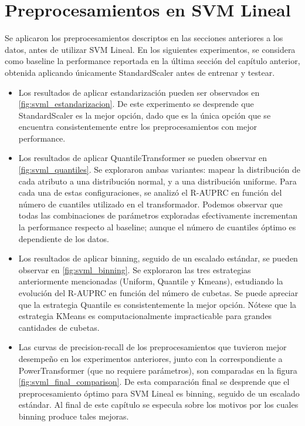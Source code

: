 \section { Preprocesamientos en SVM Lineal }

Se aplicaron los preprocesamientos descriptos en las secciones anteriores a los datos, antes de utilizar SVM Lineal. En los siguientes experimentos, se considera como baseline la performance reportada en la última sección del capítulo anterior, obtenida aplicando únicamente StandardScaler antes de entrenar y testear. 

\begin{itemize}

\item Los resultados de aplicar estandarización pueden ser observados en \ref{fig:svml_estandarizacion}. De este experimento se desprende que StandardScaler es la mejor opción, dado que es la única opción que se encuentra consistentemente entre los preprocesamientos con mejor performance.

\item Los resultados de aplicar QuantileTransformer se pueden observar en \ref{fig:svml_quantiles}. Se exploraron ambas variantes: mapear la distribución de cada atributo a una distribución normal, y a una distribución uniforme. Para cada una de estas configuraciones, se analizó el R-AUPRC en función del número de cuantiles utilizado en el transformador. Podemos observar que todas las combinaciones de parámetros exploradas efectivamente incrementan la performance respecto al baseline; aunque el número de cuantiles óptimo es dependiente de los datos.

\item Los resultados de aplicar binning, seguido de un escalado estándar, se pueden observar en \ref{fig:svml_binning}. Se exploraron las tres estrategias anteriormente mencionadas (Uniform, Quantile y Kmeans), estudiando la evolución del R-AUPRC en función del número de cubetas. Se puede apreciar que la estrategia Quantile es consistentemente la mejor opción. Nótese que la estrategia KMeans es computacionalmente impracticable para grandes cantidades de cubetas.

\item Las curvas de precision-recall de los preprocesamientos que tuvieron mejor desempeño en los experimentos anteriores, junto con la correspondiente a PowerTransformer (que no requiere parámetros), son comparadas en la figura \ref{fig:svml_final_comparison}. De esta comparación final se desprende que el preprocesamiento óptimo para SVM Lineal es binning, seguido de un escalado estándar. Al final de este capítulo se especula sobre los motivos por los cuales binning produce tales mejoras.
\end{itemize}


